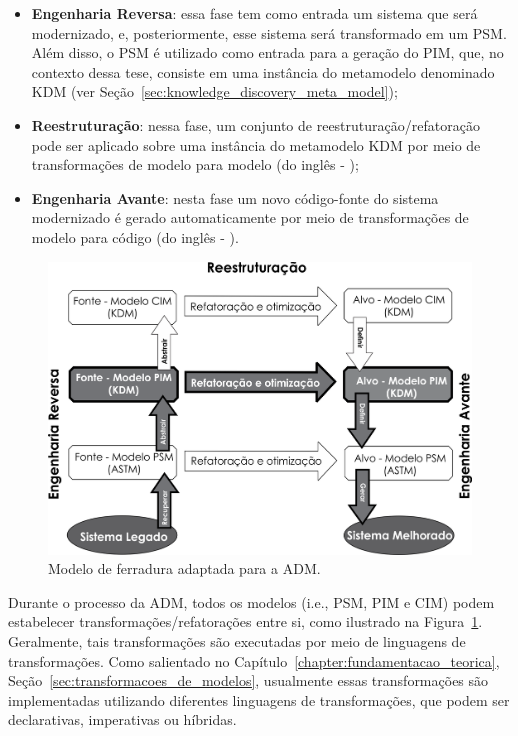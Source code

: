 \begin{itemize}
 	\item \textbf{Engenharia Reversa}: essa fase tem como entrada um sistema que será modernizado, e, posteriormente, esse sistema será transformado em um PSM. Além disso, o PSM é utilizado como entrada para a geração do PIM, que, no contexto dessa tese, consiste em uma instância do metamodelo denominado KDM (ver Seção~\ref{sec:knowledge_discovery_meta_model});
 	\item \textbf{Reestruturação}: nessa fase, um conjunto de reestruturação/refatoração pode ser aplicado sobre uma instância do metamodelo KDM por meio de transformações de modelo para modelo (do inglês - );
 	\item \textbf{Engenharia Avante}: nesta fase um novo código-fonte do sistema modernizado é gerado automaticamente por meio de transformações de modelo para código (do inglês - ). 
 \end{itemize} 

 \begin{figure}[htb]
 \caption{Modelo de ferradura adaptada para a ADM.}
 \label{fig:horse_shoe}
 \centering
 \includegraphics[scale=0.78]{images/modelo-ferradura.png}
\end{figure}

Durante o processo da ADM, todos os modelos (i.e., PSM, PIM e CIM) podem estabelecer transformações/refatorações entre si, como ilustrado na Figura~\ref{fig:horse_shoe}. Geralmente, tais transformações são executadas por meio de linguagens de transformações. Como salientado no Capítulo~\ref{chapter:fundamentacao_teorica}, Seção~\ref{sec:transformacoes_de_modelos}, usualmente essas transformações são implementadas utilizando diferentes linguagens de transformações, que podem ser declarativas, imperativas ou híbridas. 

